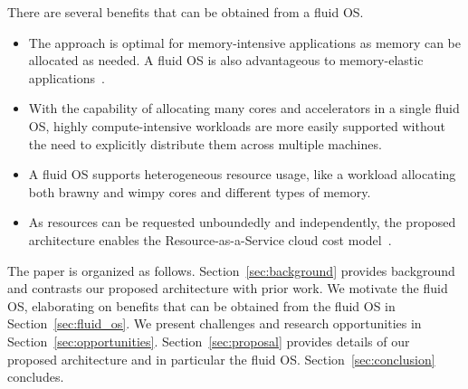 There are several benefits that can be obtained from
a fluid OS.
\begin{itemize}
\item The approach is optimal for memory-intensive applications as
memory can be allocated as needed.  A fluid OS is also
advantageous to memory-elastic applications~\cite{funaro2020memory}.
\item With the capability of allocating many cores and accelerators
in a single fluid OS, highly compute-intensive
workloads are more easily supported without the need to
explicitly distribute them across multiple machines.
\item A fluid OS supports heterogeneous resource usage,
like a workload allocating both brawny and wimpy cores and
different types of memory.
\item As resources can be requested unboundedly and independently,
the proposed architecture enables the Resource-as-a-Service
cloud cost model~\cite{ben2012resource}.
\end{itemize}

The paper is organized as follows.  Section~\ref{sec:background}
provides background and contrasts our proposed architecture with
prior work.  We motivate the fluid OS, elaborating on
benefits that can be obtained from the fluid OS in
Section~\ref{sec:fluid_os}.  We present challenges and research
opportunities in Section~\ref{sec:opportunities}.
Section~\ref{sec:proposal} provides details of our proposed
architecture and in particular the fluid OS.
Section~\ref{sec:conclusion} concludes.
